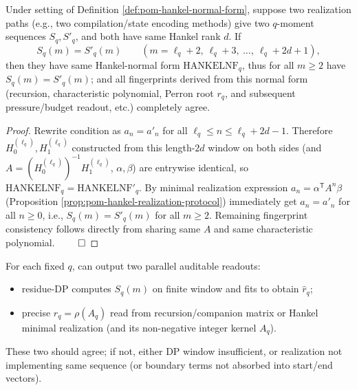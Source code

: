 \begin{proposition}\label{prop:pom-moment-finite-sampling-decidable}
Under setting of Definition \ref{def:pom-hankel-normal-form}, suppose two realization paths (e.g., two compilation/state encoding methods) give two \(q\)-moment sequences \(S_q,S'_q\), and both have same Hankel rank \(d\).
If
\[
S_q(m)=S'_q(m)\qquad(m=\ell_q+2,\ \ell_q+3,\ \dots,\ \ell_q+2d+1),
\]
then they have same Hankel-normal form \(\mathrm{HANKELNF}_q\), thus for all \(m\ge 2\) have \(S_q(m)=S'_q(m)\); and all fingerprints derived from this normal form (recursion, characteristic polynomial, Perron root \(r_q\), and subsequent pressure/budget readout, etc.) completely agree.
\end{proposition}
\begin{proof}
Rewrite condition as \(a_n=a'_n\) for all \(\ell_q\le n\le \ell_q+2d-1\).
Therefore \(H_0^{(\ell_q)},H_1^{(\ell_q)}\) constructed from this length-\(2d\) window on both sides (and \(A=(H_0^{(\ell_q)})^{-1}H_1^{(\ell_q)}\), \(\alpha,\beta\)) are entrywise identical, so \(\mathrm{HANKELNF}_q=\mathrm{HANKELNF}'_q\).
By minimal realization expression \(a_n=\alpha^{\mathsf T}A^n\beta\) (Proposition \ref{prop:pom-hankel-realization-protocol}) immediately get \(a_n=a'_n\) for all \(n\ge 0\), i.e., \(S_q(m)=S'_q(m)\) for all \(m\ge 2\).
Remaining fingerprint consistency follows directly from sharing same \(A\) and same characteristic polynomial. $\qed$
\end{proof}

\begin{remark}\label{rem:pom-dp-vs-realization-audit}
For each fixed \(q\), can output two parallel auditable readouts:
\begin{itemize}
  \item residue-DP computes \(S_q(m)\) on finite window and fits to obtain \(\widehat r_q\);
  \item precise \(r_q=\rho(A_q)\) read from recursion/companion matrix or Hankel minimal realization (and its non-negative integer kernel \(A_q\)).
\end{itemize}
These two should agree; if not, either DP window insufficient, or realization not implementing same sequence (or boundary terms not absorbed into start/end vectors).
\end{remark}

